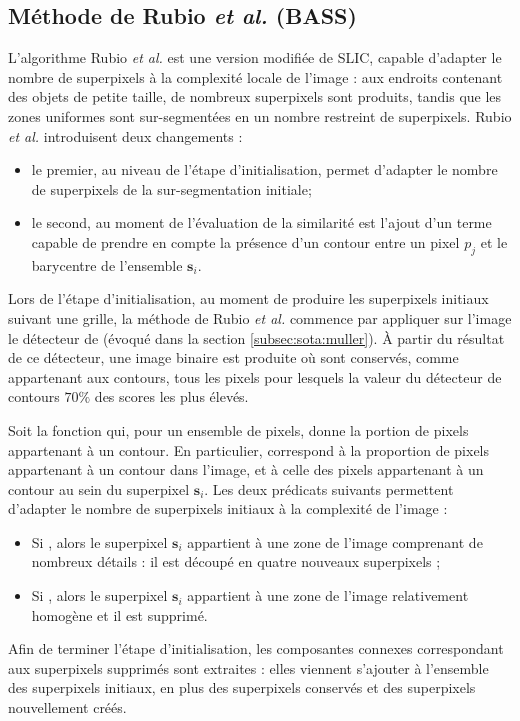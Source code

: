 \subsection{Méthode de Rubio \textit{et al.} (BASS)}

L'algorithme  Rubio \textit{et al.} \cite{rubio2016bass} est une version modifiée de SLIC, capable d'adapter le nombre de superpixels à la complexité locale de l'image : aux endroits contenant des objets de petite taille, de nombreux superpixels sont produits, tandis que les zones uniformes sont sur-segmentées en un nombre restreint de superpixels. Rubio \textit{et al.} introduisent deux changements :
\begin{itemize}
\item le premier, au niveau de l'étape d'initialisation, permet d'adapter le nombre de superpixels  de la sur-segmentation initiale; 
\item le second, au moment de l'évaluation de la similarité est l'ajout d'un terme capable de prendre en compte la présence d'un contour entre un pixel $p_{j}$ et le barycentre de l'ensemble $\mathbf{s}_{i}$.
\end{itemize}

Lors de l'étape d'initialisation, au moment de produire les superpixels initiaux suivant une grille, la méthode de Rubio \textit{et al.} commence par appliquer sur l'image le détecteur de  \cite{dollar2015fast} (évoqué dans la section \ref{subsec:sota:muller}). À partir du résultat de ce détecteur, une image binaire est produite où sont conservés, comme appartenant aux contours, tous les pixels pour lesquels la valeur du détecteur de contours  $70 \%$ des scores les plus élevés. 

Soit  la fonction qui, pour un ensemble de pixels, donne la portion de pixels appartenant à un contour. En particulier,  correspond à la proportion de pixels appartenant à un contour dans l'image, et  à celle des pixels appartenant à un contour au sein du superpixel $\mathbf{s}_{i}$. Les deux prédicats suivants permettent d'adapter le nombre de superpixels initiaux à la complexité de l'image :
\begin{itemize}
\item Si , alors le superpixel $\mathbf{s}_{i}$ appartient à une zone de l'image comprenant de nombreux détails : il est découpé en quatre nouveaux superpixels ;
\item Si  , alors le superpixel $\mathbf{s}_{i}$ appartient à une zone de l'image relativement homogène et il est supprimé.
\end{itemize}
Afin de terminer l'étape d'initialisation, les composantes connexes correspondant aux  superpixels supprimés sont extraites : elles viennent s'ajouter à l'ensemble des superpixels initiaux, en plus des superpixels conservés et des superpixels nouvellement créés. 

